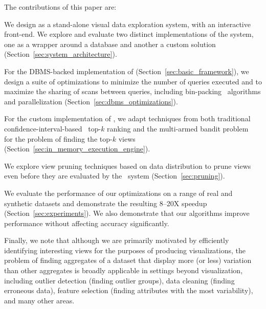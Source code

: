 The contributions of this paper are:
\begin{denselist}
  \item We design \VizRecDB as a stand-alone visual data exploration system,
  with an interactive front-end. We explore and evaluate two distinct implementations of the system, one as a
  wrapper around a database and another a custom solution (Section~\ref{sec:system_architecture}).
  \item For the DBMS-backed implementation of \VizRecDB (Section~\ref{sec:basic_framework}), we
  design a suite of optimizations to minimize the number of queries executed and to
  maximize the sharing of scans between queries, 
  including bin-packing~\cite{garey} algorithms and parallelization
  (Section~\ref{sec:dbms_optimizations}).
  \item For the custom implementation of \VizRecDB,  we adapt techniques 
  from both traditional confidence-interval-based~\cite{hoeffding1963probability} top-$k$ ranking and the
   multi-armed bandit problem~\cite{bandits} 
   for the problem of finding the top-$k$ views (Section~\ref{sec:in_memory_execution_engine}).
  \item We explore view pruning techniques based on data distribution
  to prune views even before they are evaluated by the \VizRecDB\ system 
  (Section~\ref{sec:pruning}).
  \item We evaluate the performance of our optimizations on a range of
  real and synthetic datasets and demonstrate the resulting 8--20X speedup 
  (Section~\ref{sec:experiments}). We also demonstrate that our algorithms
  improve performance without affecting accuracy significantly.
\end{denselist}
Finally, we note that although we are primarily motivated by efficiently 
identifying interesting views for the purposes of producing visualizations, 
the problem of finding aggregates of a dataset that display more (or less) variation
than other aggregates is broadly applicable in settings beyond visualization, including
outlier detection (finding outlier groups), data cleaning (finding erroneous 
data), feature selection (finding attributes with the most variability), and 
many other areas.






